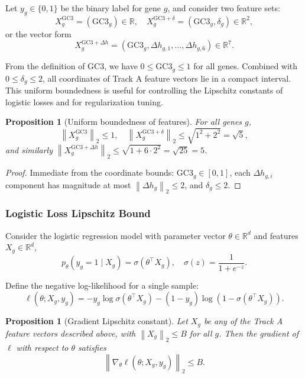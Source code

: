\documentclass[11pt]{article}
\newtheorem{proposition}[definition]{Proposition}
\newcommand{\R}{\mathbb{R}}
\newcommand{\norm}[1]{\left\lVert #1 \right\rVert}
\begin{document}
Let \(y_g \in \{0,1\}\) be the binary label for gene \(g\), and consider two feature sets:
\[
  X_g^{\mathrm{GC3}} = (\mathrm{GC3}_g) \in \R,
  \quad
  X_g^{\mathrm{GC3}+\delta} = (\mathrm{GC3}_g, \delta_g) \in \R^2,
\]
or the vector form
\[
  X_g^{\mathrm{GC3}+\Delta h} = (\mathrm{GC3}_g, \Delta h_{g,1}, \dots, \Delta h_{g,6}) \in \R^7.
\]

From the definition of GC3, we have \(0 \le \mathrm{GC3}_g \le 1\) for all genes.
Combined with \(0 \le \delta_g \le 2\), all coordinates of Track A feature vectors lie in a compact interval.
This uniform boundedness is useful for controlling the Lipschitz constants of logistic losses and for regularization tuning.

\begin{proposition}[Uniform boundedness of features]
For all genes \(g\),
\[
  \norm{X_g^{\mathrm{GC3}}}_2 \le 1,
  \quad
  \norm{X_g^{\mathrm{GC3}+\delta}}_2 \le \sqrt{1^2 + 2^2} = \sqrt{5},
\]
and similarly \(\norm{X_g^{\mathrm{GC3}+\Delta h}}_2 \le \sqrt{1 + 6 \cdot 2^2} = \sqrt{25} = 5\).
\end{proposition}

\begin{proof}
Immediate from the coordinate bounds: \(\mathrm{GC3}_g \in [0,1]\), each \(\Delta h_{g,i}\) component has magnitude at most \(\norm{\Delta h_g}_2 \le 2\), and \(\delta_g \le 2\).
\end{proof}

\subsubsection{Logistic Loss Lipschitz Bound}

Consider the logistic regression model with parameter vector \(\theta \in \R^d\) and features \(X_g \in \R^d\),
\[
  p_\theta(y_g=1 \mid X_g) = \sigma(\theta^\top X_g), \quad
  \sigma(z) = \frac{1}{1 + e^{-z}}.
\]

Define the negative log-likelihood for a single sample:
\[
  \ell(\theta; X_g, y_g) = -y_g \log \sigma(\theta^\top X_g) - (1-y_g)\log (1-\sigma(\theta^\top X_g)).
\]

\begin{proposition}[Gradient Lipschitz constant]
Let \(X_g\) be any of the Track A feature vectors described above, with \(\norm{X_g}_2 \le B\) for all \(g\).
Then the gradient of \(\ell\) with respect to \(\theta\) satisfies
\[
  \norm{\nabla_\theta \ell(\theta; X_g, y_g)}_2 \le B.
\]
\end{proposition}
\end{document}
